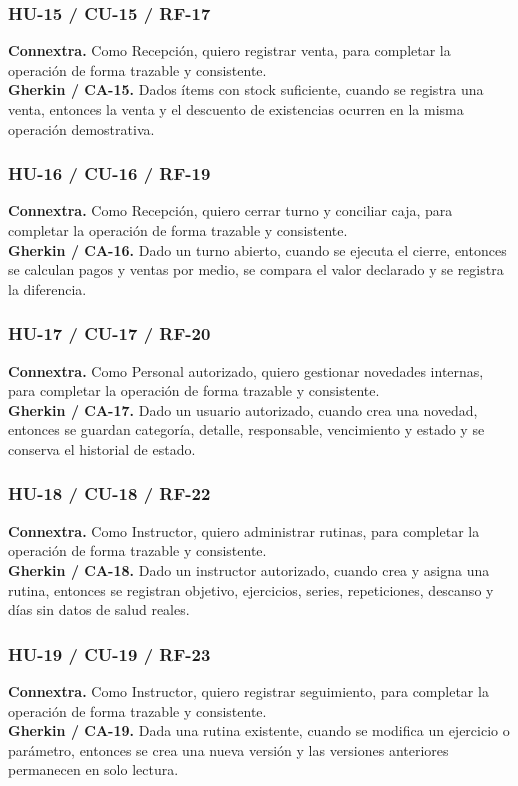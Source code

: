\documentclass[11pt,a4paper,twoside]{article}
\begin{document}
\subsubsection{HU-15 / CU-15 / RF-17}
\textbf{Connextra.} Como Recepción, quiero registrar venta, para completar la operación de forma trazable y consistente.\\
\textbf{Gherkin / CA-15.} Dados ítems con stock suficiente, cuando se registra una venta, entonces la venta y el descuento de existencias ocurren en la misma operación demostrativa.
\subsubsection{HU-16 / CU-16 / RF-19}
\textbf{Connextra.} Como Recepción, quiero cerrar turno y conciliar caja, para completar la operación de forma trazable y consistente.\\
\textbf{Gherkin / CA-16.} Dado un turno abierto, cuando se ejecuta el cierre, entonces se calculan pagos y ventas por medio, se compara el valor declarado y se registra la diferencia.
\subsubsection{HU-17 / CU-17 / RF-20}
\textbf{Connextra.} Como Personal autorizado, quiero gestionar novedades internas, para completar la operación de forma trazable y consistente.\\
\textbf{Gherkin / CA-17.} Dado un usuario autorizado, cuando crea una novedad, entonces se guardan categoría, detalle, responsable, vencimiento y estado y se conserva el historial de estado.
\subsubsection{HU-18 / CU-18 / RF-22}
\textbf{Connextra.} Como Instructor, quiero administrar rutinas, para completar la operación de forma trazable y consistente.\\
\textbf{Gherkin / CA-18.} Dado un instructor autorizado, cuando crea y asigna una rutina, entonces se registran objetivo, ejercicios, series, repeticiones, descanso y días sin datos de salud reales.
\subsubsection{HU-19 / CU-19 / RF-23}
\textbf{Connextra.} Como Instructor, quiero registrar seguimiento, para completar la operación de forma trazable y consistente.\\
\textbf{Gherkin / CA-19.} Dada una rutina existente, cuando se modifica un ejercicio o parámetro, entonces se crea una nueva versión y las versiones anteriores permanecen en solo lectura.
\end{document}

